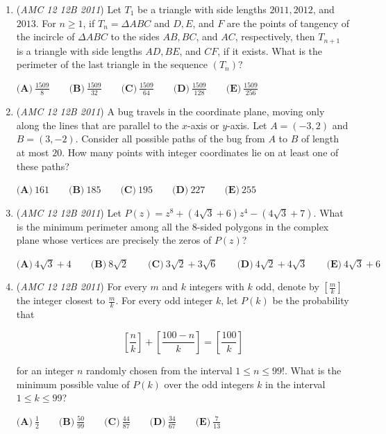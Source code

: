 \begin{enumerate}
 $\textbf{(A)}\ 24 \qquad \textbf{(B)}\ 48 \qquad \textbf{(C)}\ 54 \qquad \textbf{(D)}\ 66 \qquad \textbf{(E)}\ 70$


	\item (\textit{AMC 12 12B 2011}) Let $T_1$ be a triangle with side lengths $2011, 2012$, and $2013$. For $n \geq 1$, if $T_n = \Delta ABC$ and $D, E$, and $F$ are the points of tangency of the incircle of $\Delta ABC$ to the sides $AB, BC$, and $AC$, respectively, then $T_{n+1}$ is a triangle with side lengths $AD, BE$, and $CF$, if it exists. What is the perimeter of the last triangle in the sequence $\left(T_n\right)$?


 $\textbf{(A)}\ \frac{1509}{8} \qquad \textbf{(B)}\  \frac{1509}{32} \qquad \textbf{(C)}\  \frac{1509}{64} \qquad \textbf{(D)}\  \frac{1509}{128} \qquad \textbf{(E)}\  \frac{1509}{256}$


	\item (\textit{AMC 12 12B 2011}) A bug travels in the coordinate plane, moving only along the lines that are parallel to the $x$-axis or $y$-axis. Let $A = (-3, 2)$ and $B = (3, -2)$. Consider all possible paths of the bug from $A$ to $B$ of length at most $20$. How many points with integer coordinates lie on at least one of these paths?


 $\textbf{(A)}\ 161 \qquad \textbf{(B)}\ 185 \qquad \textbf{(C)}\  195 \qquad \textbf{(D)}\  227 \qquad \textbf{(E)}\  255$


	\item (\textit{AMC 12 12B 2011}) Let $P(z) = z^8 + \left(4\sqrt{3} + 6\right)z^4 - \left(4\sqrt{3} + 7\right)$. What is the minimum perimeter among all the $8$-sided polygons in the complex plane whose vertices are precisely the zeros of $P(z)$?


 $\textbf{(A)}\ 4\sqrt{3} + 4 \qquad \textbf{(B)}\ 8\sqrt{2} \qquad \textbf{(C)}\  3\sqrt{2} + 3\sqrt{6} \qquad \textbf{(D)}\  4\sqrt{2} + 4\sqrt{3} \qquad \textbf{(E)}\  4\sqrt{3} + 6$


	\item (\textit{AMC 12 12B 2011}) For every $m$ and $k$ integers with $k$ odd, denote by $\left[\frac{m}{k}\right]$ the integer closest to $\frac{m}{k}$. For every odd integer $k$, let $P(k)$ be the probability that


 
 \[\left[\frac{n}{k}\right] + \left[\frac{100 - n}{k}\right] = \left[\frac{100}{k}\right]\]


 for an integer $n$ randomly chosen from the interval $1 \leq n \leq 99!$. What is the minimum possible value of $P(k)$ over the odd integers $k$ in the interval $1 \leq k \leq 99$?


 $\textbf{(A)}\ \frac{1}{2} \qquad \textbf{(B)}\ \frac{50}{99} \qquad \textbf{(C)}\ \frac{44}{87} \qquad \textbf{(D)}\  \frac{34}{67} \qquad \textbf{(E)}\  \frac{7}{13}$


\end{enumerate}